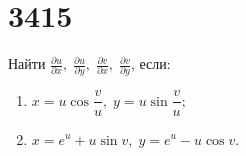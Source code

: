 \documentclass[a4paper,12pt]{article}
\begin{document}
\section*{3415}
Найти \(\displaystyle \frac{\partial u}{\partial x},\; \frac{\partial u}{\partial y},\; \frac{\partial v}{\partial x},\; \frac{\partial v}{\partial y}\), если:
\begin{enumerate}
    \item[a)] \(x = u \cos \dfrac{v}{u},\; y = u \sin \dfrac{v}{u};\)
    \item[б)] \(x = e^u + u \sin v,\; y = e^u - u \cos v.\)
\end{enumerate}
\end{document}
